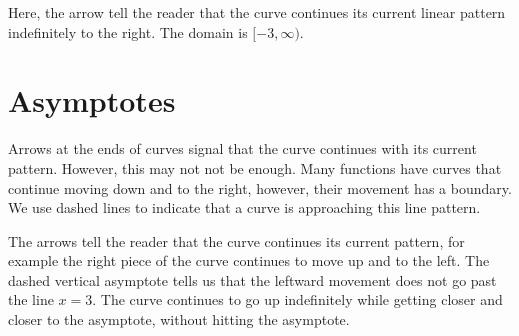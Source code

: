 \documentclass{ximera}
\begin{document}
Here, the arrow tell the reader that the curve continues its current linear pattern indefinitely to the right.  The domain is $[-3, \infty)$.











\section{Asymptotes}


Arrows at the ends of curves signal that the curve continues with its current pattern. However, this may not not be enough.  Many functions have curves that continue moving down and to the right, however, their movement has a boundary. We use dashed lines to indicate that a curve is approaching this line pattern.


\begin{image}
\end{image}


The arrows tell the reader that the curve continues its current pattern, for example the right piece of the curve continues to move up and to the left.  The dashed vertical asymptote tells us that the leftward movement does not go past the line $x=3$.  The curve continues to go up indefinitely while getting closer and closer to the asymptote, without hitting the asymptote. 
\end{document}
